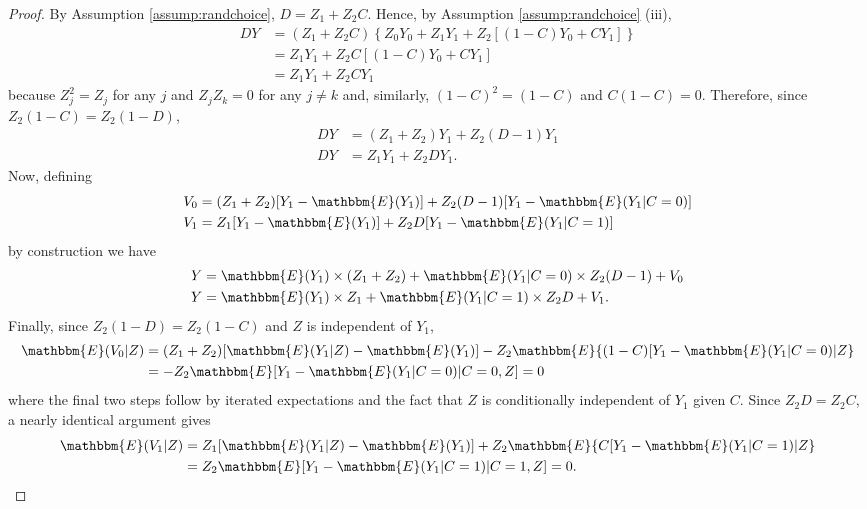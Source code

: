 \begin{proof}
By Assumption \ref{assump:randchoice}, $D = Z_1 + Z_2 C$. Hence, by Assumption \ref{assump:randchoice} (iii),
\begin{align*}
DY &=  (Z_1 + Z_2 C)\left\{Z_0 Y_0 + Z_1 Y_1 + Z_2[(1 - C) Y_0 + CY_1]\right\}\\
&= Z_1 Y_1 + Z_2 C[(1 -C) Y_0 + C Y_1]\\
&= Z_1 Y_1 + Z_2 C Y_1
\end{align*}
because $Z_j^2 = Z_j$ for any $j$ and $Z_j Z_k = 0$ for any $j \neq k$ and, similarly, $(1 - C)^2 = (1 - C)$ and $C (1 - C) = 0$. Therefore, since $Z_2 (1 - C) = Z_2 (1 - D)$,
\begin{align*}
 DY &= (Z_1 + Z_2)Y_1 + Z_2 (D - 1) Y_1\\
 DY &= Z_1 Y_1 + Z_2 D Y_1.
\end{align*}
Now, defining
\begin{align*}
V_0 &= (Z_1 + Z_2)[Y_1 - \mathbbm{E}(Y_1)] + Z_2(D - 1)[Y_1 - \mathbbm{E}(Y_1|C=0)]\\
V_1 &= Z_1[Y_1 - \mathbbm{E}(Y_1)] + Z_2D[Y_1 - \mathbbm{E}(Y_1|C=1)]
\end{align*}
by construction we have
\begin{align*}
Y &= \mathbbm{E}(Y_1) \times (Z_1 + Z_2) + \mathbbm{E}(Y_1 | C = 0) \times Z_2 (D - 1) + V_0\\
Y &= \mathbbm{E}(Y_1) \times Z_1 + \mathbbm{E}(Y_1 | C = 1) \times Z_2 D + V _1.
\end{align*}
Finally, since $Z_2(1 - D) = Z_2(1 - C)$ and $Z$ is independent of $Y_1$,
\begin{align*}
\mathbbm{E}(V_0|Z) &= (Z_1 + Z_2) [\mathbbm{E}(Y_1|Z) - \mathbbm{E}(Y_1) ]  - Z_2 \mathbbm{E}\{(1 - C)  [Y_1 - \mathbbm{E}(Y_1 | C=0)|Z\} \\
&= -Z_2 \mathbbm{E}[Y_1 - \mathbbm{E}(Y_1 | C=0)|C=0, Z] = 0
\end{align*}
where the final two steps follow by iterated expectations and the fact that  $Z$ is conditionally independent of $Y_1$ given $C$. 
Since $Z_2 D = Z_2 C$, a nearly identical argument gives
\begin{align*}
\mathbbm{E}(V_1|Z) &= Z_1 [\mathbbm{E}(Y_1 | Z) - \mathbbm{E}(Y_1)]  + Z_2 \mathbbm{E}\{C  [Y_1 - \mathbbm{E}(Y_1 | C=1)|Z\} \\
&= Z_2 \mathbbm{E}[Y_1 - \mathbbm{E}(Y_1 | C=1)|C=1, Z] = 0. \qedhere
\end{align*}
\end{proof}




